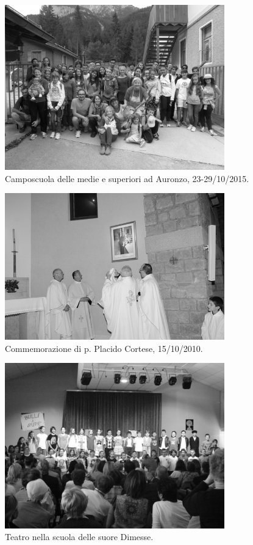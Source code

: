 \begin{figure}
    \captionsetup{labelformat=empty}
    \centering
	  \includegraphics[width=0.85\textwidth]{immagini/camposcuola2015.jpg}
    \caption{ Camposcuola delle medie e superiori ad Auronzo, 23-29/10/2015.}
		\vspace{-15pt}
\end{figure}
\newpage
\begin{figure}
    \captionsetup{labelformat=empty}
    \centering
	  \includegraphics[width=0.85\textwidth]{immagini/CommemorazionePadrePlacido.jpg}
    \caption{Commemorazione di p. Placido Cortese, 15/10/2010.}
		\vspace{-15pt}
\end{figure}
\newpage
\begin{figure}
    \captionsetup{labelformat=empty}
    \centering
	  \includegraphics[width=0.85\textwidth]{immagini/TeatroScuolaDimesse.jpg}
    \caption{Teatro nella scuola delle suore Dimesse.}
		\vspace{-15pt}
\end{figure}
\newpage